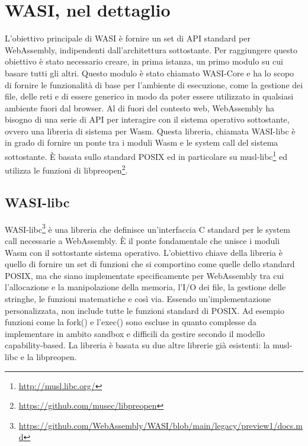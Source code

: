 \chapter{WASI, nel dettaglio}
\label{chap:wasi-in-depth}
L'obiettivo principale di WASI è fornire un set di API standard per WebAssembly, indipendenti dall'architettura
sottostante. Per raggiungere questo obiettivo è stato necessario creare, in prima istanza, un primo modulo su cui basare
tutti gli altri. Questo modulo è stato chiamato WASI-Core e ha lo scopo di fornire le funzionalità di base per
l'ambiente di esecuzione, come la gestione dei file, delle reti e di essere generico in modo da poter essere utilizzato
in qualsiasi ambiente fuori dal browser. Al di fuori del contesto web, WebAssembly ha bisogno di una serie di API per
interagire con il sistema operativo sottostante, ovvero una libreria di sistema per Wasm. Questa libreria, chiamata
WASI-libc è in grado di fornire un ponte tra i moduli Wasm e le system call del sistema sottostante. È basata sullo
standard POSIX ed in particolare su musl-libc\footnote{\url{http://musl.libc.org/}} ed utilizza le funzioni di
libpreopen\footnote{\url{https://github.com/musec/libpreopen}}.

\section{WASI-libc}
WASI-libc\footnote{\url{https://github.com/WebAssembly/WASI/blob/main/legacy/preview1/docs.md}} è una libreria che
definisce un'interfaccia C standard per le system call necessarie a WebAssembly. È il ponte fondamentale che unisce i
moduli Wasm con il sottostante sistema operativo. L'obiettivo chiave della libreria è quello di fornire un set di
funzioni che si comportino come quelle dello standard POSIX, ma che siano implementate specificamente per WebAssembly
tra cui l'allocazione e la manipolazione della memoria, l'I/O dei file, la gestione delle stringhe, le funzioni
matematiche e così via. Essendo un'implementazione personalizzata, non include tutte le funzioni standard di POSIX. Ad
esempio funzioni come la fork() e l'exec() sono escluse in quanto complesse da implementare in ambito sandbox e
difficili da gestire secondo il modello capability-based. La libreria è basata su due altre librerie già esistenti: la
musl-libc e la libpreopen.
